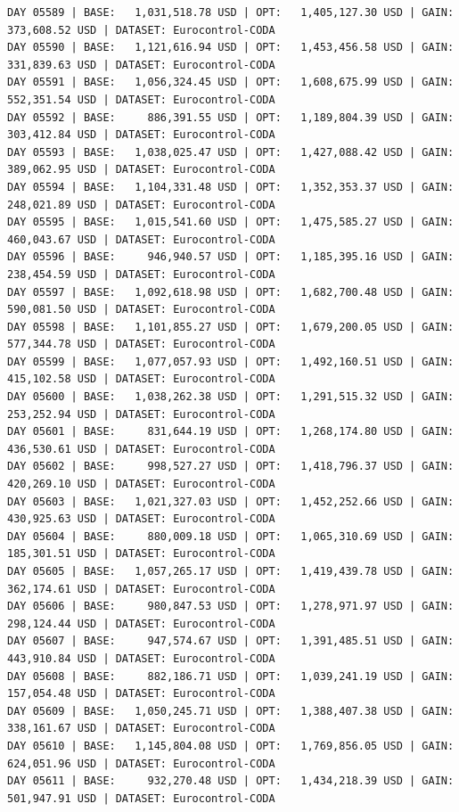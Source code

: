 \documentclass[11pt,a4paper]{article}
\begin{document}
\begin{verbatim}
DAY 05589 | BASE:   1,031,518.78 USD | OPT:   1,405,127.30 USD | GAIN: 373,608.52 USD | DATASET: Eurocontrol-CODA
DAY 05590 | BASE:   1,121,616.94 USD | OPT:   1,453,456.58 USD | GAIN: 331,839.63 USD | DATASET: Eurocontrol-CODA
DAY 05591 | BASE:   1,056,324.45 USD | OPT:   1,608,675.99 USD | GAIN: 552,351.54 USD | DATASET: Eurocontrol-CODA
DAY 05592 | BASE:     886,391.55 USD | OPT:   1,189,804.39 USD | GAIN: 303,412.84 USD | DATASET: Eurocontrol-CODA
DAY 05593 | BASE:   1,038,025.47 USD | OPT:   1,427,088.42 USD | GAIN: 389,062.95 USD | DATASET: Eurocontrol-CODA
DAY 05594 | BASE:   1,104,331.48 USD | OPT:   1,352,353.37 USD | GAIN: 248,021.89 USD | DATASET: Eurocontrol-CODA
DAY 05595 | BASE:   1,015,541.60 USD | OPT:   1,475,585.27 USD | GAIN: 460,043.67 USD | DATASET: Eurocontrol-CODA
DAY 05596 | BASE:     946,940.57 USD | OPT:   1,185,395.16 USD | GAIN: 238,454.59 USD | DATASET: Eurocontrol-CODA
DAY 05597 | BASE:   1,092,618.98 USD | OPT:   1,682,700.48 USD | GAIN: 590,081.50 USD | DATASET: Eurocontrol-CODA
DAY 05598 | BASE:   1,101,855.27 USD | OPT:   1,679,200.05 USD | GAIN: 577,344.78 USD | DATASET: Eurocontrol-CODA
DAY 05599 | BASE:   1,077,057.93 USD | OPT:   1,492,160.51 USD | GAIN: 415,102.58 USD | DATASET: Eurocontrol-CODA
DAY 05600 | BASE:   1,038,262.38 USD | OPT:   1,291,515.32 USD | GAIN: 253,252.94 USD | DATASET: Eurocontrol-CODA
DAY 05601 | BASE:     831,644.19 USD | OPT:   1,268,174.80 USD | GAIN: 436,530.61 USD | DATASET: Eurocontrol-CODA
DAY 05602 | BASE:     998,527.27 USD | OPT:   1,418,796.37 USD | GAIN: 420,269.10 USD | DATASET: Eurocontrol-CODA
DAY 05603 | BASE:   1,021,327.03 USD | OPT:   1,452,252.66 USD | GAIN: 430,925.63 USD | DATASET: Eurocontrol-CODA
DAY 05604 | BASE:     880,009.18 USD | OPT:   1,065,310.69 USD | GAIN: 185,301.51 USD | DATASET: Eurocontrol-CODA
DAY 05605 | BASE:   1,057,265.17 USD | OPT:   1,419,439.78 USD | GAIN: 362,174.61 USD | DATASET: Eurocontrol-CODA
DAY 05606 | BASE:     980,847.53 USD | OPT:   1,278,971.97 USD | GAIN: 298,124.44 USD | DATASET: Eurocontrol-CODA
DAY 05607 | BASE:     947,574.67 USD | OPT:   1,391,485.51 USD | GAIN: 443,910.84 USD | DATASET: Eurocontrol-CODA
DAY 05608 | BASE:     882,186.71 USD | OPT:   1,039,241.19 USD | GAIN: 157,054.48 USD | DATASET: Eurocontrol-CODA
DAY 05609 | BASE:   1,050,245.71 USD | OPT:   1,388,407.38 USD | GAIN: 338,161.67 USD | DATASET: Eurocontrol-CODA
DAY 05610 | BASE:   1,145,804.08 USD | OPT:   1,769,856.05 USD | GAIN: 624,051.96 USD | DATASET: Eurocontrol-CODA
DAY 05611 | BASE:     932,270.48 USD | OPT:   1,434,218.39 USD | GAIN: 501,947.91 USD | DATASET: Eurocontrol-CODA

\end{verbatim}
\end{document}
